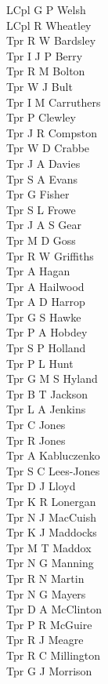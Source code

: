 \begin{multicols}{3}
  LCpl G P Welsh \\
  LCpl R Wheatley \\
  Tpr R W Bardsley \\
  Tpr I J P Berry \\
  Tpr R M Bolton \\
  Tpr W J Bult \\
  Tpr I M Carruthers \\
  Tpr P Clewley \\
  Tpr J R Compston \\
  Tpr W D Crabbe \\
  Tpr J A Davies \\
  Tpr S A Evans \\
  Tpr G Fisher \\
  Tpr S L Frowe \\
  Tpr J A S Gear \\
  Tpr M D Goss \\
  Tpr R W Griffiths \\
  Tpr A Hagan \\
  Tpr A Hailwood \\
  Tpr A D Harrop \\
  Tpr G S Hawke \\
  Tpr P A Hobdey \\
  Tpr S P Holland \\
  Tpr P L Hunt \\
  Tpr G M S Hyland \\
  Tpr B T Jackson \\
  Tpr L A Jenkins \\
  Tpr C Jones \\
  Tpr R Jones \\
  Tpr A Kabluczenko \\
  Tpr S C Lees-Jones \\
  Tpr D J Lloyd \\
  Tpr K R Lonergan \\
  Tpr N J MacCuish \\
  Tpr K J Maddocks \\
  Tpr M T Maddox \\
  Tpr N G Manning \\
  Tpr R N Martin \\
  Tpr N G Mayers \\
  Tpr D A McClinton \\
  Tpr P R McGuire \\
  Tpr R J Meagre \\
  Tpr R C Millington \\
  Tpr G J Morrison \\

\end{multicols}
